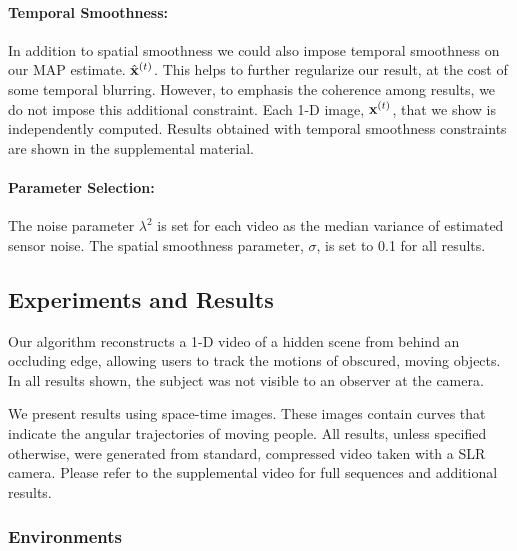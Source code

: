 \vspace{-.1in}
\paragraph{Temporal Smoothness: }

In addition to spatial smoothness we could also impose temporal smoothness on our MAP estimate. $\hat{\bf{x}}^{(t)}$. This helps to further regularize our result, at the cost of some temporal blurring.
However, to emphasis the coherence among results, we do not impose this additional constraint. Each 1-D image, $\mathbf{x}^{(t)}$, that we show is independently computed.
Results obtained with temporal smoothness constraints are shown in the supplemental material. 


\vspace{-.1in}
\paragraph{Parameter Selection: }
The noise parameter $\lambda^2$ is set for each video as the median variance of estimated sensor noise. The spatial smoothness parameter, $\sigma$, is set to 0.1 for all results.


\vspace{-.1in}
\subsection{Experiments and Results}


Our algorithm reconstructs a 1-D video of a hidden scene from behind an occluding edge, allowing users to track the motions of obscured, moving objects. 
In all results shown, the subject was not visible to an observer at the camera. 


We present results using space-time images. These images contain curves that indicate the angular trajectories of moving people. All results, unless specified otherwise, were generated from standard, compressed video taken with a SLR camera. Please refer to the supplemental video for full sequences and additional results.

\subsubsection{Environments}

